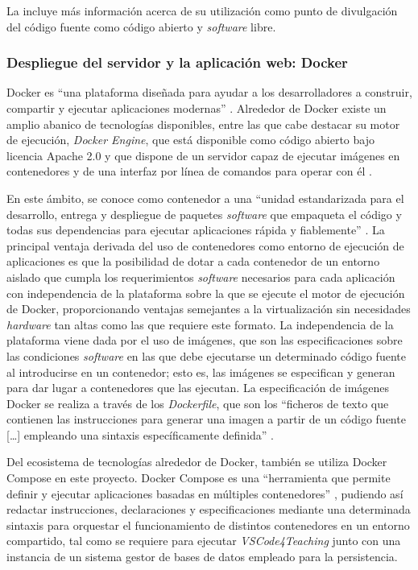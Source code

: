 La  incluye más información acerca de su utilización como punto de divulgación del código fuente como código abierto y \textit{software} libre.

\subsubsection{Despliegue del servidor y la aplicación web: Docker}
\label{subsec:tecDocker}
Docker es ``una plataforma diseñada para ayudar a los desarrolladores a construir, compartir y ejecutar aplicaciones modernas'' \cite{Docker}. Alrededor de Docker existe un amplio abanico de tecnologías disponibles, entre las que cabe destacar su motor de ejecución, \textit{Docker Engine}, que está disponible como código abierto bajo licencia Apache 2.0 y que dispone de un servidor capaz de ejecutar imágenes en contenedores y de una interfaz por línea de comandos para operar con él \cite{DockerEngine}.

En este ámbito, se conoce como contenedor a una ``unidad estandarizada para el desarrollo, entrega y despliegue de paquetes \textit{software} que empaqueta el código y todas sus dependencias para ejecutar aplicaciones rápida y fiablemente'' \cite{DockerContainers}. La principal ventaja derivada del uso de contenedores como entorno de ejecución de aplicaciones es que la posibilidad de dotar a cada contenedor de un entorno aislado que cumpla los requerimientos \textit{software} necesarios para cada aplicación con independencia de la plataforma sobre la que se ejecute el motor de ejecución de Docker, proporcionando ventajas semejantes a la virtualización sin necesidades \textit{hardware} tan altas como las que requiere este formato. La independencia de la plataforma viene dada por el uso de imágenes, que son las especificaciones sobre las condiciones \textit{software} en las que debe ejecutarse un determinado código fuente al introducirse en un contenedor; esto es, las imágenes se especifican y generan para dar lugar a contenedores que las ejecutan. La especificación de imágenes Docker se realiza a través de los \textit{Dockerfile}, que son los ``ficheros de texto que contienen las instrucciones para generar una imagen a partir de un código fuente [\dots] empleando una sintaxis específicamente definida'' \cite{Dockerfile}.

Del ecosistema de tecnologías alrededor de Docker, también se utiliza Docker Compose en este proyecto. Docker Compose es una ``herramienta que permite definir y ejecutar aplicaciones basadas en múltiples contenedores'' \cite{DockerCompose}, pudiendo así redactar instrucciones, declaraciones y especificaciones mediante una determinada sintaxis para orquestar el funcionamiento de distintos contenedores en un entorno compartido, tal como se requiere para ejecutar \textit{VSCode4Teaching} junto con una instancia de un sistema gestor de bases de datos empleado para la persistencia.


